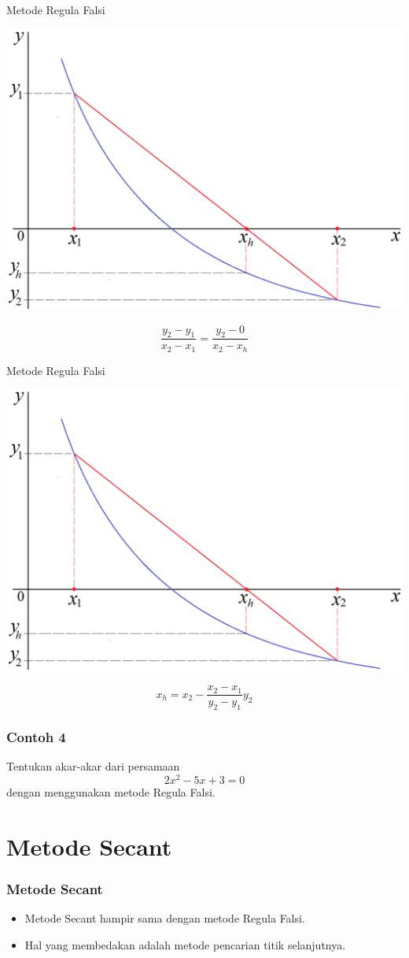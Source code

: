 \documentclass[pdflatex,compress,mathserif]{beamer}
\begin{document}
\begin{frame}{Metode Regula Falsi}
	\begin{center}
		\includegraphics[width=0.7\linewidth]{img/03}
	\end{center}
	$$ \frac{y_2 - y_1}{x_2 - x_1} = \frac{y_2 - 0}{x_2 - x_h} $$
\end{frame}

\begin{frame}{Metode Regula Falsi}
	\begin{center}
		\includegraphics[width=0.7\linewidth]{img/03}
	\end{center}
	$$ x_h = x_2 - \frac{x_2 - x_1}{y_2 - y_1}y_2 $$
\end{frame}

\begin{frame}
	\frametitle{Contoh 4}
	Tentukan akar-akar dari persamaan $$ 2x^2 - 5x + 3 = 0 $$ dengan menggunakan metode Regula Falsi.
\end{frame}

\section{Metode Secant}

\begin{frame}
	\frametitle{Metode Secant}
	\begin{itemize}
		\item Metode Secant hampir sama dengan metode Regula Falsi.
		\item Hal yang membedakan adalah metode pencarian titik selanjutnya.
	\end{itemize}
\end{frame}
\end{document}
